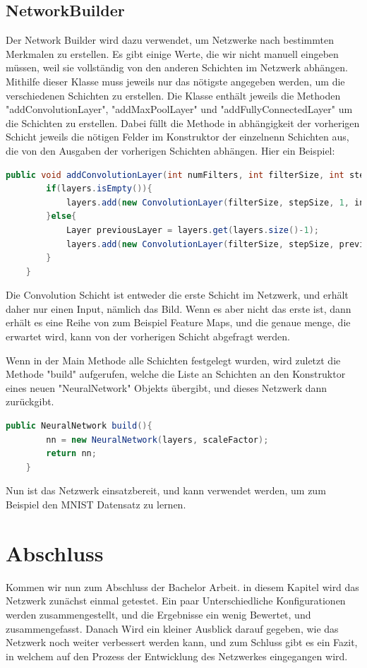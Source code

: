 \documentclass[12pt]{article}
\begin{document}
\subsection{NetworkBuilder}
Der Network Builder wird dazu verwendet, um Netzwerke nach bestimmten Merkmalen zu erstellen. Es gibt einige Werte, die wir nicht manuell eingeben müssen, weil sie vollständig von den anderen Schichten im Netzwerk abhängen. Mithilfe dieser Klasse muss jeweils nur das nötigste angegeben werden, um die verschiedenen Schichten zu erstellen.
Die Klasse enthält jeweils die Methoden "addConvolutionLayer", "addMaxPoolLayer" und "addFullyConnectedLayer" um die Schichten zu erstellen. Dabei füllt die Methode in abhängigkeit der vorherigen Schicht jeweils die nötigen Felder im Konstruktor der einzelnenn Schichten aus, die von den Ausgaben der vorherigen Schichten abhängen. Hier ein Beispiel:
\begin{lstlisting}[language=Java]
public void addConvolutionLayer(int numFilters, int filterSize, int stepSize, double learnRate){
        if(layers.isEmpty()){
            layers.add(new ConvolutionLayer(filterSize, stepSize, 1, inputRows, inputCols, numFilters, learnRate));
        }else{
            Layer previousLayer = layers.get(layers.size()-1);
            layers.add(new ConvolutionLayer(filterSize, stepSize, previousLayer.getOutputLength(), previousLayer.getOutputRows(), previousLayer.getOutputCols(), numFilters, learnRate));
        }
    }
\end{lstlisting}
Die Convolution Schicht ist entweder die erste Schicht im Netzwerk, und erhält daher nur einen Input, nämlich das Bild. Wenn es aber nicht das erste ist, dann erhält es eine Reihe von zum Beispiel Feature Maps, und die genaue menge, die erwartet wird, kann von der vorherigen Schicht abgefragt werden.

Wenn in der Main Methode alle Schichten festgelegt wurden, wird zuletzt die Methode "build" aufgerufen, welche die Liste an Schichten an den Konstruktor eines neuen "NeuralNetwork" Objekts übergibt, und dieses Netzwerk dann zurückgibt.
\begin{lstlisting}[language=Java]
public NeuralNetwork build(){
        nn = new NeuralNetwork(layers, scaleFactor);
        return nn;
    }
\end{lstlisting}

Nun ist das Netzwerk einsatzbereit, und kann verwendet werden, um zum Beispiel den MNIST Datensatz zu lernen.


\cleardoublepage
\section{Abschluss}
Kommen wir nun zum Abschluss der Bachelor Arbeit. in diesem Kapitel wird das Netzwerk zunächst einmal getestet. Ein paar Unterschiedliche Konfigurationen werden zusammengestellt, und die Ergebnisse ein wenig Bewertet, und zusammengefasst. Danach Wird ein kleiner Ausblick darauf gegeben, wie das Netzwerk noch weiter verbessert werden kann, und zum Schluss gibt es ein Fazit, in welchem auf den Prozess der Entwicklung des Netzwerkes eingegangen wird.
\end{document}
